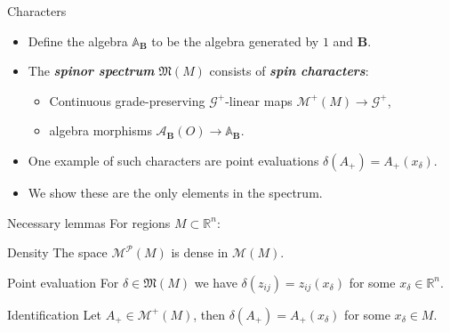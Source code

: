 \documentclass[aspectratio=169,handout]{beamer}
\newcommand\boldgreen[1]{\textcolor{lighter_csu_green}{\emph{\textbf{#1}}}}
\newcommand{\R}{\mathbb{R}}
\newcommand{\algebra}{\mathcal{A}}
\newcommand{\G}{\mathcal{G}}
\newcommand{\characters}{\mathfrak{M}}
\newcommand{\monogenics}{\mathcal{M}}
\newcommand{\dualmonogenics}{\mathcal{M}^*}
\newcommand{\blade}[1]{\boldsymbol{#1}}
\newcommand{\monogenicfields}[1]{\mathcal{M}^{#1}(M)}
\newcommand{\bivector}{\blade{B}}
\begin{document}



\begin{frame}{Characters}
\vfill
\begin{itemize}
\pause
\item Define the algebra $\mathbb{A}_{\bivector}$ to be the algebra generated by $1$ and $\bivector$.
\pause
\item The \boldgreen{spinor spectrum} $\characters(M)$ consists of \boldgreen{spin characters}:
\begin{itemize}
  \item Continuous grade-preserving $\G^+$-linear maps $\monogenics^+(M) \to \G^+$,
  \item algebra morphisms $\algebra_{\bivector}(O) \to \mathbb{A}_{\bivector}$.
\end{itemize}
\pause
\item One example of such characters are point evaluations $\delta(A_+)=A_+(x_\delta)$.
\pause
\item We show these are the only elements in the spectrum.
\end{itemize}
\vfill
\end{frame}


\begin{frame}{Necessary lemmas}
\vfill
\pause
For regions $M\subset \R^n$:
\pause
\begin{lemm*}{Density}{}
The space $\monogenics^\mathcal{P}(M)$ is dense in $\monogenics(M)$.
\end{lemm*}
\pause
\begin{lemm*}{Point evaluation}{}
For $\delta \in \characters(M)$ we have $\delta(z_{ij})=z_{ij}(x_\delta)$ for some $x_\delta \in \R^n$.
\end{lemm*}
\pause
\begin{lemm*}{Identification}{}
Let $A_+\in \mathcal{M}^+(M)$, then $\delta (A_+)=A_+(x_\delta)$ for some $x_\delta \in M$.
\end{lemm*}
\vfill
\end{frame}
\end{document}
